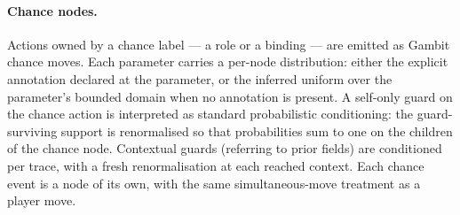 \paragraph{Chance nodes.}  Actions owned by a chance label ---
a  role or a  binding --- are emitted as
Gambit chance moves.  Each parameter carries a per-node
distribution: either the explicit 
annotation declared at the parameter, or the inferred uniform
over the parameter's bounded domain when no annotation is
present.  A self-only guard on the chance action is interpreted
as standard probabilistic conditioning: the guard-surviving
support is renormalised so that probabilities sum to one on the
children of the chance node.  Contextual guards (referring to
prior fields) are conditioned per trace, with a fresh
renormalisation at each reached context.  Each chance event is
a node of its own, with the same simultaneous-move treatment as a
player move.
